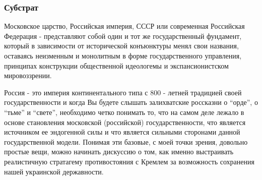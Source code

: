  
 
 
 
 

\subsubsection{Субстрат}

Московское царство, Российская империя, СССР или современная Российская
Федерация - представляют собой один и тот же государственный фундамент, который
в зависимости от исторической конъюнктуры менял свои названия, оставаясь
неизменным и монолитным в форме государственного управления, принципах
конструкции общественной идеологемы и экспансионистском мировоззрении.

Россия - это империя континентального типа с 800 - летней традицией своей
государственности и когда Вы будете слышать залихватские россказни о \enquote{орде}, о
\enquote{тьме} и \enquote{свете}, необходимо четко понимать то, что на самом деле лежало в
основе становления московской (российской) государственности, что является
источником ее эндогенной силы и что является сильными сторонами данной
государственной модели. Понимая эти базовые, с моей точки зрения, довольно
простые вещи, можно начинать дискуссию о том, как именно выстраивать
реалистичную стратагему противостояния с Кремлем за возможность сохранения
нашей украинской державности.
